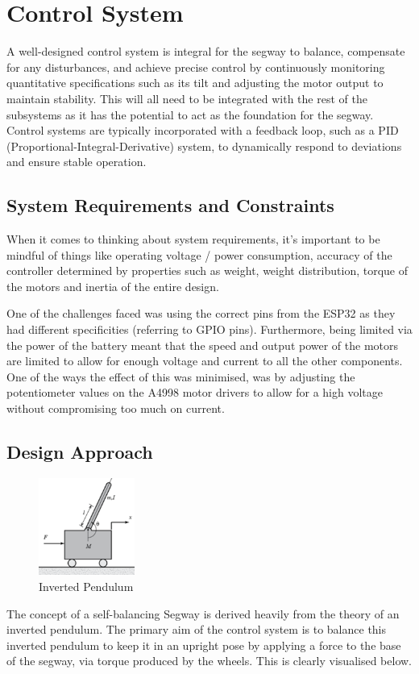 \section{Control System}

A well-designed control system is integral for the segway to balance, compensate for any disturbances, and achieve precise control by continuously monitoring quantitative specifications such as its tilt and adjusting the motor output to maintain stability. This will all need to be integrated with the rest of the subsystems as it has the potential to act as the foundation for the segway. Control systems are typically incorporated with a feedback loop, such as a PID (Proportional-Integral-Derivative) system, to dynamically respond to deviations and ensure stable operation.

\subsection{System Requirements and Constraints}

When it comes to thinking about system requirements, it’s important to be mindful of things like operating voltage / power consumption, accuracy of the controller determined by properties such as weight, weight distribution, torque of the motors and inertia of the entire design.

One of the challenges faced was using the correct pins from the ESP32 as they had different specificities (referring to GPIO pins). Furthermore, being limited via the power of the battery meant that the speed and output power of the motors are limited to allow for enough voltage and current to all the other components. One of the ways the effect of this was minimised, was by adjusting the potentiometer values on the A4998 motor drivers to allow for a high voltage without compromising too much on current. 

\newpage

\subsection{Design Approach}
\begin{figure}
    \centerline{\includegraphics[width=0.28\textwidth]{images/balance.png}}
    \caption{Inverted Pendulum}
    \label{fig:balance}
\end{figure}
The concept of a self-balancing Segway is derived heavily from the theory of an inverted pendulum. The primary aim of the control system is to balance this inverted pendulum to keep it in an upright pose by applying a force to the base of the segway, via torque produced by the wheels. This is clearly visualised below.



